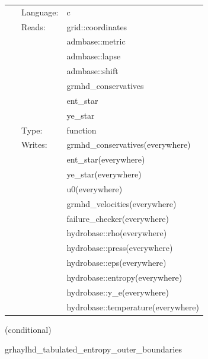 \begin{tabular*}{160mm}{cll} 
~ & Language:  & c \\ 
~ & Reads:  & grid::coordinates \\ 
~& ~ &admbase::metric\\ 
~& ~ &admbase::lapse\\ 
~& ~ &admbase::shift\\ 
~& ~ &grmhd\_conservatives\\ 
~& ~ &ent\_star\\ 
~& ~ &ye\_star\\ 
~ & Type:  & function \\ 
~ & Writes:  & grmhd\_conservatives(everywhere) \\ 
~& ~ &ent\_star(everywhere)\\ 
~& ~ &ye\_star(everywhere)\\ 
~& ~ &u0(everywhere)\\ 
~& ~ &grmhd\_velocities(everywhere)\\ 
~& ~ &failure\_checker(everywhere)\\ 
~& ~ &hydrobase::rho(everywhere)\\ 
~& ~ &hydrobase::press(everywhere)\\ 
~& ~ &hydrobase::eps(everywhere)\\ 
~& ~ &hydrobase::entropy(everywhere)\\ 
~& ~ &hydrobase::y\_e(everywhere)\\ 
~& ~ &hydrobase::temperature(everywhere)\\ 
\end{tabular*} 


\vspace{5mm}

   (conditional) 

\hspace{5mm} grhaylhd\_tabulated\_entropy\_outer\_boundaries 

\hspace{5mm}{\it entropy+tabulated version of grhaylhd\_outer\_boundaries } 


\hspace{5mm}

